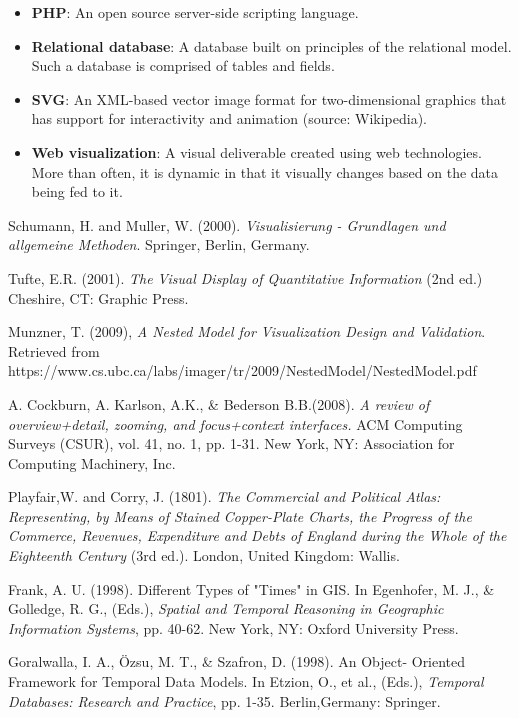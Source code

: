 \documentclass[12pt]{article}
\begin{document}
{\begin{itemize}
\item[] \textbf{PHP}: An open source server-side scripting language.
\item[] \textbf{Relational database}: A database built on principles of the relational model. Such a database is comprised of tables and fields.
\item[] \textbf{SVG}: An XML-based vector image format for two-dimensional graphics that has support for interactivity and animation (source: Wikipedia).
\item[] \textbf{Web visualization}: A visual deliverable created using web technologies. More than often, it is dynamic in that it visually changes based on the data being fed to it. 
\end{itemize}

\vfill

\begin{thebibliography}{1}

   Schumann, H. and Muller, W. (2000). {\em Visualisierung - Grundlagen und allgemeine Methoden}. Springer, Berlin, Germany.

    Tufte, E.R. (2001). {\em The Visual Display of Quantitative Information} (2nd ed.) Cheshire, CT: Graphic Press.

   Munzner, T. (2009), {\em A Nested Model for Visualization Design and Validation}. Retrieved from \\ https://www.cs.ubc.ca/labs/imager/tr/2009/NestedModel/NestedModel.pdf

   A. Cockburn, A. Karlson, A.K., \& Bederson B.B.(2008). {\em A review of overview+detail, zooming, and focus+context interfaces.} ACM Computing Surveys (CSUR), vol. 41, no. 1, pp. 1-31. New York, NY: Association for Computing Machinery, Inc.
  
   Playfair,W. and Corry, J. (1801). {\em The Commercial and Political Atlas: Representing,
by Means of Stained Copper-Plate Charts, the Progress of the Commerce,
Revenues, Expenditure and Debts of England during the Whole of
the Eighteenth Century} (3rd ed.). London, United Kingdom: Wallis.
  
   Frank, A. U. (1998). Different Types of "Times" in GIS. In Egenhofer, M. J.,
\& Golledge, R. G., (Eds.), {\em Spatial and Temporal Reasoning in Geographic
Information Systems}, pp. 40-62. New York, NY: Oxford University Press.

   Goralwalla, I. A., \"{O}zsu, M. T., \& Szafron, D. (1998). An Object-
Oriented Framework for Temporal Data Models. In Etzion, O., et al., (Eds.), {\em Temporal Databases: Research and Practice}, pp. 1-35. Berlin,Germany: Springer.
  

\end{thebibliography}}
\end{document}
